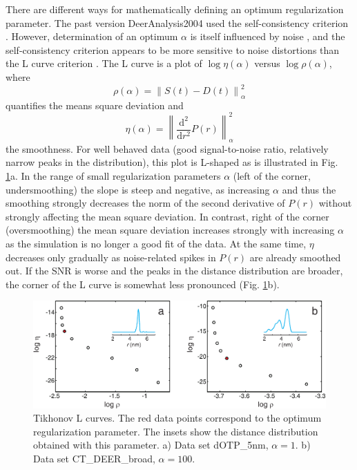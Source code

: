 \documentclass{article}
\begin{document}
There are different ways for mathematically defining an optimum regularization parameter. The past version DeerAnalysis2004 used the self-consistency criterion \cite{honerkamp1990, weese1992}. However, determination of an optimum $\alpha$ is itself influenced by noise \cite{jeschke2004a}, and the self-consistency criterion appears to be more sensitive to noise distortions than the L curve criterion \cite{freed2005}. The L curve is a plot of $\log \eta ( \alpha )$ versus $\log \rho ( \alpha )$, where 
\begin{equation}
	\rho \left( \alpha \right) = \left\| S \left( t \right) - D \left( t \right)  \right\|_{\alpha}^2
\end{equation}
quantifies the means square deviation and
\begin{equation}
	\eta \left( \alpha \right) = \left\| \frac{\mathrm{d}^2}{\mathrm{d}r^2} P \left( r \right) \right\|_{\alpha}^2
\end{equation}
the smoothness. For well behaved data (good signal-to-noise ratio, relatively narrow peaks in the distribution), this plot is L-shaped as is illustrated in Fig. \ref{fig:manfig6}a. In the range of small regularization parameters $\alpha$ (left of the corner, undersmoothing) the slope is steep and negative, as increasing $\alpha$ and thus the smoothing strongly decreases the norm of the second derivative of $P(r)$ without strongly affecting the mean square deviation. In contrast, right of the corner (oversmoothing) the mean square deviation increases strongly with increasing $\alpha$ as the simulation is no longer a good fit of the data. At the same time, $\eta$ decreases only gradually as noise-related spikes in $P(r)$ are already smoothed out. If the SNR is worse and the peaks in the distance distribution are broader, the corner of the L curve is somewhat less pronounced (Fig. \ref{fig:manfig6}b).

\begin{figure}[ht]
 	\begin{center}
  \includegraphics[width=1.0\textwidth]{fig6.pdf}
	\end{center}
	\caption{Tikhonov L curves. The red data points correspond to the optimum regularization parameter. The insets show the distance distribution obtained with this parameter. a) Data set dOTP\_5nm, $\alpha = 1$. b) Data set CT\_DEER\_broad, $\alpha = 100$.}
	\label{fig:manfig6}
\end{figure}
\end{document}
